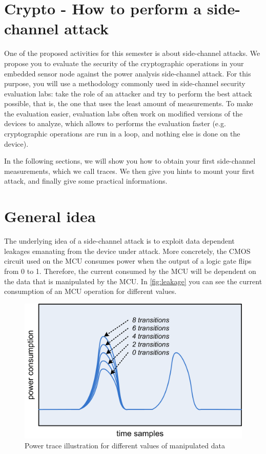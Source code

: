 \newpage
\section{Crypto - How to perform a side-channel attack}
One of the proposed activities for this semester is about side-channel attacks. We propose you to evaluate the security of the cryptographic operations in your embedded sensor node against the power analysis side-channel attack.
For this purpose, you will use a methodology commonly used in side-channel security evaluation labs: take the role of an attacker and try to perform the best attack possible, that is, the one that uses the least amount of measurements.
To make the evaluation easier, evaluation labs often work on modified versions of the devices to analyze, which allows to performs the evaluation faster (e.g. cryptographic operations are run in a loop, and nothing else is done on the device).

In the following sections, we will show you how to obtain your first side-channel measurements, which we call traces. We then give you hints to mount your first attack, and finally give some practical informations.

\section{General idea}
The underlying idea of a side-channel attack is to exploit data dependent leakages emanating from the device under attack. More concretely, the CMOS circuit used on the MCU consumes power when the output of a logic gate flips from 0 to 1. Therefore, the current consumed by the MCU will be dependent on the data that is manipulated by the MCU. In \autoref{fig:leakage} you can see the current consumption of an MCU operation for different values.\\

\begin{figure}[h]
    \centering
    \includegraphics[width=0.5\linewidth]{figs/leakage.png}
    \caption{Power trace illustration for different values of manipulated data}
    \label{fig:leakage}
\end{figure}

